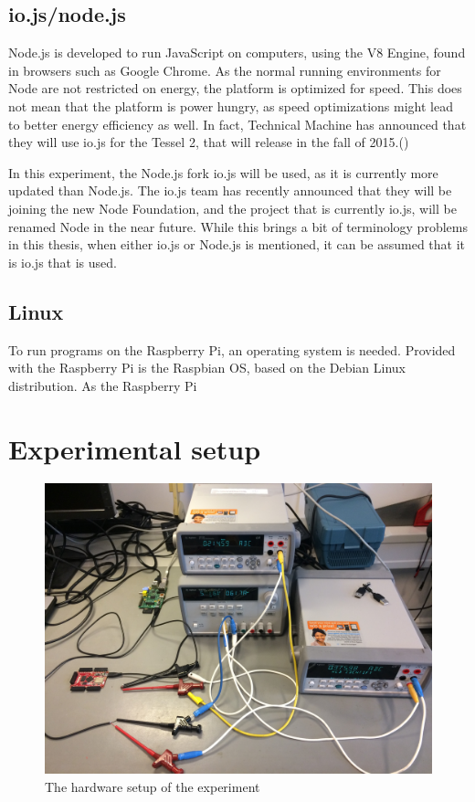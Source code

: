 \subsection{io.js/node.js}
Node.js is developed to run JavaScript on computers, using the V8 Engine, found in browsers such as Google Chrome.
As the normal running environments for Node are not restricted on energy, the platform is optimized for speed.
This does not mean that the platform is power hungry, as speed optimizations might lead to better energy efficiency as well.
In fact, Technical Machine has announced that they will use io.js for the Tessel 2, that will release in the fall of 2015.(\cite{movingfaster})

In this experiment, the Node.js fork io.js will be used, as it is currently more updated than Node.js.
The io.js team has recently announced that they will be joining the new Node Foundation, and the project that is currently io.js, will be renamed Node in the near future.
While this brings a bit of terminology problems in this thesis, when either io.js or Node.js is mentioned, it can be assumed that it is io.js that is used.


\subsection{Linux}
To run programs on the Raspberry Pi, an operating system is needed.
Provided with the Raspberry Pi is the Raspbian OS, based on the Debian Linux distribution.
As the Raspberry Pi



\section{Experimental setup}

\begin{figure}[ht]
\centering
\includegraphics[width=\textwidth]{fig/pics/setup.jpg}
\caption{The hardware setup of the experiment}
\label{fig:setup}
\end{figure}

